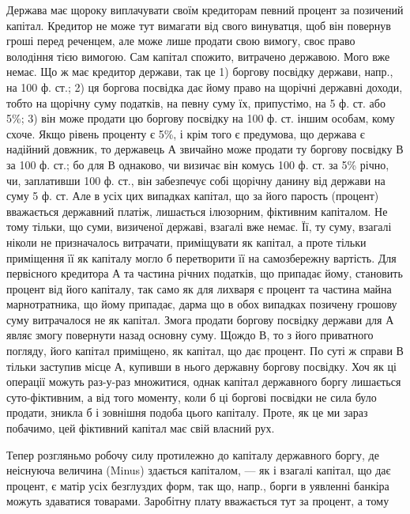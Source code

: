 Держава має щороку виплачувати своїм кредиторам певний процент за
позичений капітал. Кредитор не може тут вимагати від свого винуватця, щоб він
повернув гроші перед реченцем, але може лише продати свою вимогу, своє
право володіння тією вимогою. Сам капітал спожито, витрачено державою. Мого
вже немає. Що ж має кредитор держави, так це 1) боргову посвідку держави,
напр., на 100 ф. ст.; 2) ця боргова посвідка дає йому право на щорічні
державні доходи, тобто на щорічну суму податків, на певну суму їх, припустімо,
на 5 ф. ст. або 5\%; 3) він може продати цю боргову посвідку на 100 ф. ст.
іншим особам, кому схоче. Якщо рівень проценту є 5\%, і крім того є предумова,
що держава є надійний довжник, то державець А звичайно може продати ту боргову
посвідку В за 100 ф. ст.; бо для В однаково, чи визичає він комусь 100 ф. ст.
за 5\% річно, чи, заплативши 100 ф. ст., він забезпечує собі щорічну данину
від держави на суму 5 ф. ст. Але в усіх цих випадках капітал, що за його
парость (процент) вважається державний платіж, лишається ілюзорним, фіктивним
капіталом. Не тому тільки, що суми, визиченої державі, взагалі вже немає.
Її, ту суму, взагалі ніколи не призначалось витрачати, приміщувати як капітал,
а проте тільки приміщення її як капіталу могло б перетворити її на самозбережну
вартість. Для первісного кредитора А та частина річних податків, що припадає
йому, становить процент від його капіталу, так само як для лихваря є процент
та частина майна марнотратника, що йому припадає, дарма що в обох випадках
позичену грошову суму витрачалося не як капітал. Змога продати боргову
посвідку держави для А являє змогу повернути назад основну суму. Щождо В,
то з його приватного погляду, його капітал приміщено, як капітал, що дає
процент. По суті ж справи В тільки заступив місце А, купивши в нього
державну боргову посвідку. Хоч як ці операції можуть раз-у-раз множитися,
однак капітал державного боргу лишається суто-фіктивним, а від того моменту,
коли б ці боргові посвідки не сила було продати, зникла б і зовнішня подоба
цього капіталу. Проте, як це ми зараз побачимо, цей фіктивний капітал
має свій власний рух.

Тепер розгляньмо робочу силу протилежно до капіталу державного боргу,
де неіснуюча величина (Minus) здається капіталом, — як і взагалі капітал, що дає
процент, є матір усіх безглуздих форм, так що, напр., борги в уявленні банкіра
можуть здаватися товарами. Заробітну плату вважається тут за процент, а тому
\parbreak{}  %
